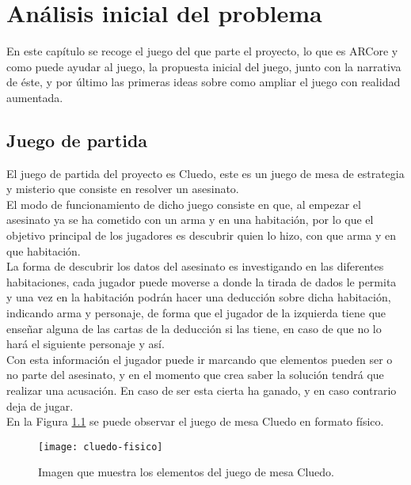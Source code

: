 \chapter{Análisis inicial del problema}
\label{ch:analisis}
En este capítulo se recoge el juego del que parte el proyecto, lo que es ARCore y como puede ayudar al juego, la propuesta inicial del juego, junto con la narrativa de éste, y por último las primeras ideas sobre como ampliar el juego con realidad aumentada.

\section{Juego de partida}
El juego de partida del proyecto es Cluedo, este es un juego de mesa de estrategia y misterio que consiste en resolver un asesinato.\\

El modo de funcionamiento de dicho juego consiste en que, al empezar el asesinato ya se ha cometido con un arma y en una habitación, por lo que el objetivo principal de los jugadores es descubrir quien lo hizo, con que arma y en que habitación.\\

La forma de descubrir los datos del asesinato es investigando en las diferentes habitaciones, cada jugador puede moverse a donde la tirada de dados le permita y una vez en la habitación podrán hacer una deducción sobre dicha habitación, indicando arma y personaje, de forma que el jugador de la izquierda tiene que enseñar alguna de las cartas de la deducción si las tiene, en caso de que no lo hará el siguiente personaje y así.\\

Con esta información el jugador puede ir marcando que elementos pueden ser o no parte del asesinato, y en el momento que crea saber la solución tendrá que realizar una acusación. En caso de ser esta cierta ha ganado, y en caso contrario deja de jugar.\\

En la Figura \ref{figura-cluedo-fisico} se puede observar el juego de mesa Cluedo en formato físico.

\begin{figure}[h]
  \centering
  \texttt{[image: cluedo-fisico]}
  \caption{Imagen que muestra los elementos del juego de mesa Cluedo.\protect\footnotemark}
  \label{figura-cluedo-fisico}
\end{figure}



